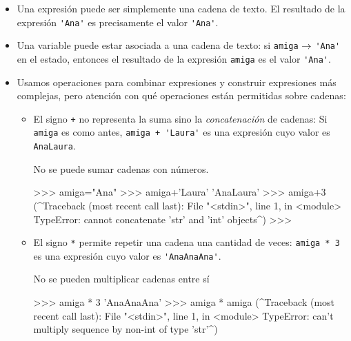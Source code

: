 \begin{itemize}
\item Una expresión puede ser simplemente una cadena de texto.  El resultado de
    la expresión \lstinline!'Ana'! es precisamente el valor \lstinline!'Ana'!.

\item Una variable puede estar asociada a una cadena de texto: si
    \lstinline!amiga! $\rightarrow$ \lstinline!'Ana'! en el estado, entonces el
    resultado de la expresión \lstinline!amiga! es el valor \lstinline!'Ana'!.

\item Usamos operaciones para combinar expresiones y construir
expresiones más complejas, pero atención con qué operaciones están
permitidas sobre cadenas:

\begin{itemize}
    \item El signo \lstinline!+! no representa la suma sino la
        \emph{concatenación} de cadenas: Si \lstinline!amiga! es como antes,
        \lstinline!amiga + 'Laura'!  es una expresión cuyo valor es
        \lstinline!AnaLaura!.

\begin{atencion}
No se puede sumar cadenas con números.
\begin{codigo-python-sn}
>>> amiga="Ana"
>>> amiga+'Laura'
'AnaLaura'
>>> amiga+3
(^Traceback (most recent call last):
  File "<stdin>", line 1, in <module>
TypeError: cannot concatenate 'str' and 'int' objects^)
>>>
\end{codigo-python-sn}
\end{atencion}

\item El signo \lstinline!*! permite repetir una cadena una cantidad de veces:
    \lstinline!amiga * 3! es una expresión cuyo valor es
    \lstinline!'AnaAnaAna'!.

\begin{atencion}
No se pueden multiplicar cadenas entre sí

\begin{codigo-python-sn}
>>> amiga * 3
'AnaAnaAna'
>>> amiga * amiga
(^Traceback (most recent call last):
  File "<stdin>", line 1, in <module>
TypeError: can't multiply sequence by non-int of type 'str'^)
\end{codigo-python-sn}
\end{atencion}

\end{itemize}

\end{itemize}

